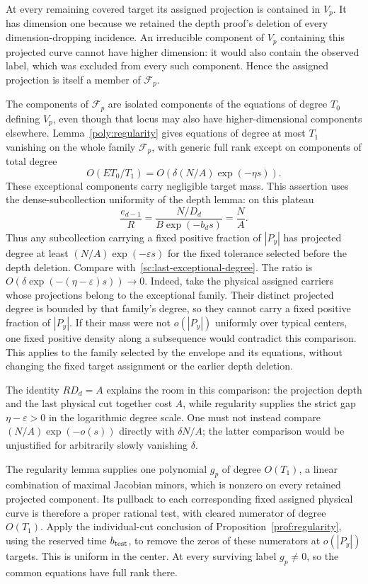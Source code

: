 At every remaining covered target its assigned projection is contained in $V_p$.
It has dimension one because we retained the depth proof's deletion of
every dimension-dropping incidence.  An irreducible component of $V_p$
containing this projected curve cannot have higher dimension: it would
also contain the observed label, which was excluded from every such
component.  Hence the assigned projection is itself a member of
$\mathcal F_p$.

The components of $\mathcal F_p$ are isolated components of the equations
of degree $T_0$ defining $V_p$, even though that locus
may also have higher-dimensional components elsewhere.
Lemma~\ref{poly:regularity} gives equations of degree at most $T_1$
vanishing on the whole family $\mathcal F_p$, with generic full rank except on
components of total degree
\begin{equation}\label{sc:last-exceptional-degree}
 O(E T_0/T_1)=O(\delta(N/A)\exp(-\eta s)).
\end{equation}
These exceptional components carry negligible target
mass.  This assertion uses the dense-subcollection
uniformity of the depth lemma: on this plateau
\[
 \frac{e_{d-1}}{R}
 =\frac{N/D_d}{B\exp(-b_d s)}=\frac NA.
\]
Thus any subcollection carrying a fixed positive fraction of $|P_y|$
has projected degree at least
$(N/A)\exp(-\varepsilon s)$ for the fixed tolerance selected before
the depth deletion.  Compare
with~\eqref{sc:last-exceptional-degree}.  The ratio is
$O(\delta\exp(- (\eta-\varepsilon)s))\to0$.
Indeed, take the physical assigned carriers whose projections belong to
the exceptional family.  Their distinct projected degree is bounded by
that family's degree, so they cannot carry a fixed positive fraction of $|P_y|$.
If their mass were not $o(|P_y|)$ uniformly over typical centers, one fixed
positive density along a subsequence would contradict this comparison.
This applies to the family selected by the envelope and its equations,
without changing the fixed target assignment or the earlier depth deletion.

The identity $RD_d=A$ explains the room in this comparison: the projection
depth and the last physical cut together cost $A$, while regularity supplies
the strict gap $\eta-\varepsilon>0$ in the logarithmic degree scale.
One must not instead compare
$(N/A)\exp(-o(s))$ directly with $\delta N/A$; the latter
comparison would be unjustified for arbitrarily slowly
vanishing $\delta$.

The regularity lemma supplies one polynomial $g_p$ of degree $O(T_1)$,
a linear combination of maximal Jacobian minors, which is nonzero on
every retained projected component.  Its pullback to each corresponding
fixed assigned physical curve is therefore a proper rational test, with
cleared numerator of degree $O(T_1)$.  Apply the individual-cut conclusion
of Proposition~\ref{prof:regularity}, using the reserved time
$b_{\rm test}$, to remove the zeros of these numerators at $o(|P_y|)$
targets.  This is uniform in the center.  At every surviving label
$g_p\ne0$, so the common equations have full rank there.

